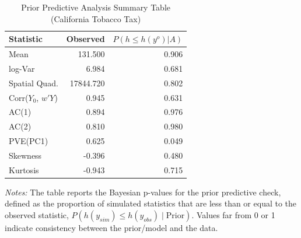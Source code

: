 \begin{table}[H]
\centering
\caption{Prior Predictive Analysis Summary Table (California Tobacco Tax)}
\label{tab:ca_ppa}
\centering
\begin{tabular}[t]{lrr}
\toprule
Statistic & Observed & $P(h \leq h(y^{o}) | A)$\\
\midrule
Mean & 131.500 & 0.906\\
log-Var & 6.984 & 0.681\\
Spatial Quad. & 17844.720 & 0.802\\
Corr($Y_0$, $w'Y$) & 0.945 & 0.631\\
AC(1) & 0.894 & 0.976\\
\addlinespace
AC(2) & 0.810 & 0.980\\
PVE(PC1) & 0.625 & 0.049\\
Skewness & -0.396 & 0.480\\
Kurtosis & -0.943 & 0.715\\
\bottomrule
\end{tabular}
\begin{tablenotes}
  \footnotesize
  \item \textit{Notes:} The table reports the Bayesian p-values for the prior predictive check, defined as the proportion of simulated statistics that are less than or equal to the observed statistic, $P(h(y_{sim}) \le h(y_{obs}) \mid \text{Prior})$. Values far from 0 or 1 indicate consistency between the prior/model and the data.
\end{tablenotes}
\end{table}
